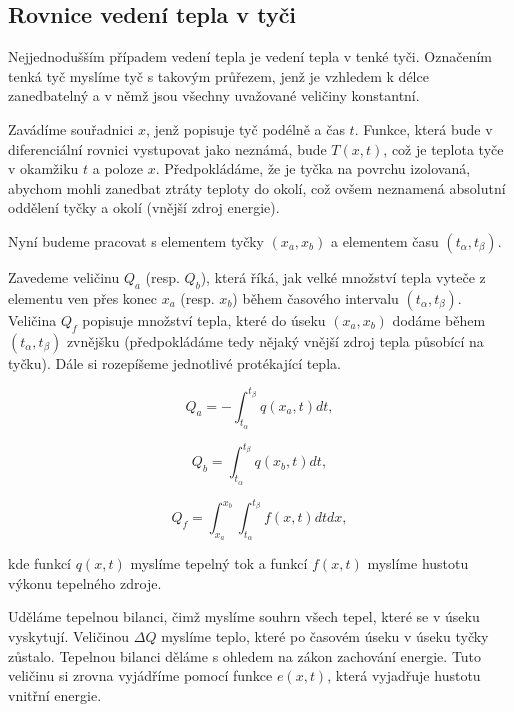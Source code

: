 \documentclass[a4]{report}
\theoremstyle{definition}
\begin{document}
\subsection{Rovnice vedení tepla v tyči}

Nejjednodušším případem vedení tepla je vedení tepla v tenké tyči. Označením tenká tyč myslíme tyč s takovým průřezem, jenž je vzhledem k délce zanedbatelný a v němž jsou všechny uvažované veličiny konstantní.

Zavádíme souřadnici $x$, jenž popisuje tyč podélně a čas $t$. Funkce, která bude v diferenciální rovnici vystupovat jako neznámá, bude $T(x,t)$, což je teplota tyče v okamžiku $t$ a poloze $x$. Předpokládáme, že je tyčka na povrchu izolovaná, abychom mohli zanedbat ztráty teploty do okolí, což ovšem neznamená absolutní oddělení tyčky a okolí (vnější zdroj energie). 

Nyní budeme pracovat s elementem tyčky $(x_a,x_b)$ a elementem času $(t_\alpha, t_\beta)$.

Zavedeme veličinu $Q_a$ (resp. $Q_b$), která říká, jak velké množství tepla vyteče z elementu ven přes konec $x_a$ (resp. $x_b$) během časového intervalu $(t_\alpha,t_\beta)$. Veličina $Q_f$ \mbox{popisuje} množství tepla, které do úseku $(x_a,x_b)$ dodáme během $(t_\alpha,t_\beta)$ zvnějšku (předpo\-kládáme tedy nějaký vnější zdroj tepla působící na tyčku). Dále si rozepíšeme \mbox{jednotlivé} protékající tepla.

\begin{equation}
Q_a =-\int_{t_\alpha}^{t_\beta} q(x_a,t) dt,   
\end{equation}

\begin{equation}
Q_b =\int_{t_\alpha}^{t_\beta} q(x_b,t) dt,   
\end{equation}

\begin{equation}
Q_f =\int_{x_a}^{x_b} \int_{t_\alpha}^{t_\beta} f(x,t) dt dx  ,
\end{equation}

kde funkcí $q(x,t)$ myslíme tepelný tok a funkcí $f(x,t)$ myslíme hustotu výkonu tepelného zdroje.

Uděláme tepelnou bilanci, čimž myslíme souhrn všech tepel, které se v úseku vyskytují. Veličinou $\Delta Q$ myslíme teplo, které po časovém úseku v úseku tyčky zůstalo. Tepelnou bilanci děláme s ohledem na zákon zachování energie. Tuto veličinu si zrovna vyjádříme pomocí funkce $e(x,t)$, která vyjadřuje hustotu vnitřní energie.
\end{document}
